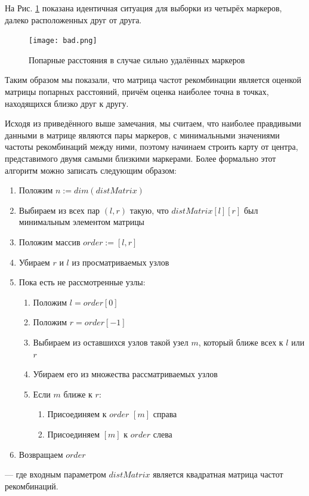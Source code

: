\documentclass{matmex-diploma-custom}
\begin{document}
На Рис. \ref{fig:fig2} показана идентичная ситуация для выборки из
четырёх маркеров, далеко расположенных друг от друга.

\begin{figure}[h]
 \centering
  \texttt{[image: bad.png]}
  \caption[width=0.8\textwidth]{Попарные расстояния в случае сильно
    удалённых маркеров}
  \label{fig:fig2}
\end{figure}

Таким образом мы показали, что матрица частот рекомбинации является
оценкой матрицы попарных расстояний, причём оценка наиболее точна в
точках, находящихся близко друг к другу.

Исходя из приведённого выше замечания, мы считаем, что наиболее
правдивыми данными в матрице являются пары маркеров, с минимальными
значениями частоты рекомбинаций между ними, поэтому начинаем строить
карту от центра, представимого двумя самыми близкими маркерами. Более
формально этот алгоритм можно записать следующим образом:
\begin{enumerate}
\item Положим $n := dim(distMatrix)$
\item Выбираем из всех пар $(l,r)$ такую, что
  $distMatrix[l][r]$ был минимальным элементом матрицы
\item Положим массив $order := [l, r]$
\item Убираем $r$ и $l$ из просматриваемых узлов
\item Пока есть не рассмотренные узлы:
  \begin{enumerate}
  \item Положим $l = order[0]$
  \item Положим $r = order[-1]$
  \item Выбираем из оставшихся узлов такой узел $m$, который
    ближе всех к $l$ или $r$
  \item Убираем его из множества рассматриваемых узлов
  \item Если $m$ ближе к $r$:
    \begin{enumerate}
    \item Присоединяем к $order$ $[m]$ справа
    \item Присоединяем $[m]$ к $order$ слева
    \end{enumerate}
  \end{enumerate}
  \item Возвращаем $order$
\end{enumerate}
--- где входным параметром $distMatrix$ является квадратная матрица
частот рекомбинаций.
\end{document}
